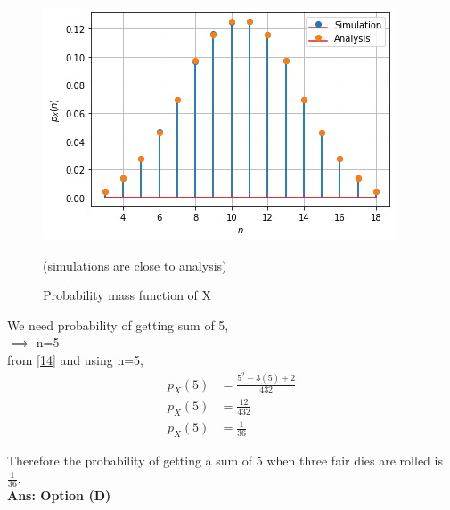 \begin{figure}[htp]
    \centering
    \includegraphics[width=\columnwidth]{solutions/xe/2017/figures/assign3_stem.png}
    \caption{Probability mass function of X}{ (simulations are close to analysis)}
\end{figure}
We need probability of getting sum of 5,\\$\implies$ n=5 \\from \eqref{14} and using n=5,
\begin{align}
    p_X(5)&=\frac{5^2-3(5)+2}{432}\\
    p_X(5)&=\frac{12}{432}\\
    p_X(5)&=\frac{1}{36}
\end{align}

Therefore the probability of getting a sum of 5 when three fair dies are rolled is $\frac{1}{36}$.\\
\textbf{Ans: Option (D)}

